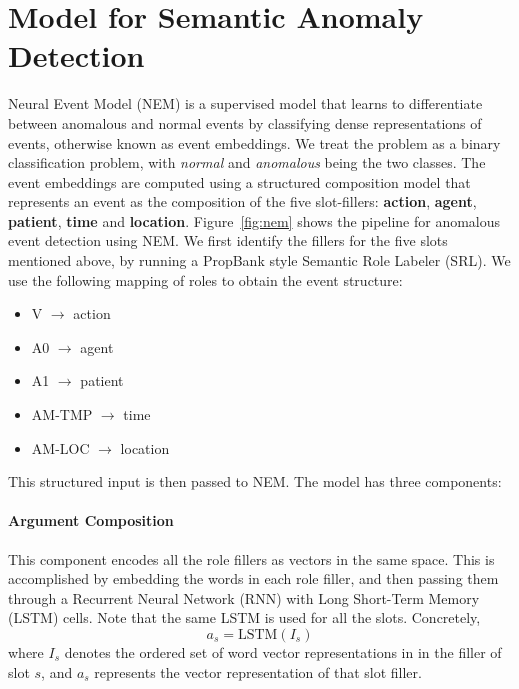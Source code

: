 \section{Model for Semantic Anomaly Detection}
Neural Event Model (NEM) is a supervised model that learns to differentiate between anomalous and
normal events by 
classifying dense representations of events, otherwise known as event embeddings. We treat the problem as a binary classification problem, with
\textit{normal} and \textit{anomalous} being the two classes.
The event embeddings are computed using a structured composition model
that represents an event as the composition of the five slot-fillers: \textbf{action},
\textbf{agent}, \textbf{patient}, \textbf{time} and \textbf{location}.
Figure~\ref{fig:nem} shows the pipeline for anomalous event detection using NEM. We
first identify the fillers for the five slots mentioned above, by running a PropBank \citep{palmer2005proposition}
style Semantic Role Labeler (SRL). We use the following mapping of roles to obtain the event structure:
\begin{itemize}
 \item V $\rightarrow$ action
 \item A0 $\rightarrow$ agent
 \item A1 $\rightarrow$ patient
 \item AM-TMP $\rightarrow$ time
 \item AM-LOC $\rightarrow$ location
\end{itemize}
This structured input is then passed to NEM. The model has three components:

\paragraph{Argument Composition} This component encodes all the role fillers as vectors in the same space.
This is accomplished by embedding the words in each role filler, and then passing them through a Recurrent
Neural Network (RNN) with Long Short-Term Memory (LSTM) \citep{hochreiter1997long} cells. Note that the same LSTM is
used for all the slots. Concretely,
\begin{equation}
 a_s = \text{LSTM}(I_s)
\end{equation}
where $I_s$ denotes the ordered set of word vector representations in in the filler of slot $s$, and
$a_s$ represents the vector representation of that slot filler.


